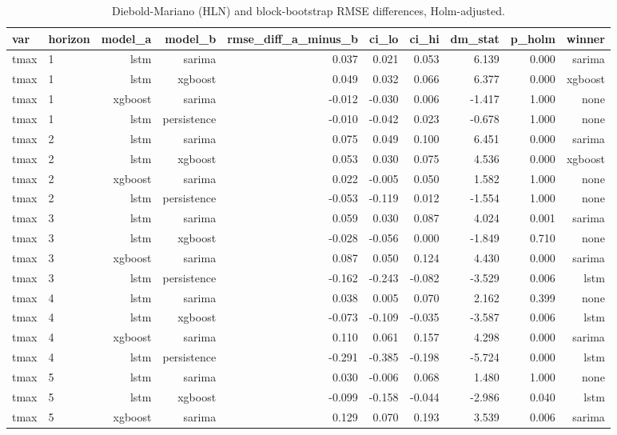 \begin{table}[t]
\centering
\caption{Diebold-Mariano (HLN) and block-bootstrap RMSE differences, Holm-adjusted.}
\label{tab:sig}
\begin{tabular}{llrrrrrrrr}
\toprule
var & horizon & model\_a & model\_b & rmse\_diff\_a\_minus\_b & ci\_lo & ci\_hi & dm\_stat & p\_holm & winner \\
\midrule
tmax & 1 & lstm & sarima & 0.037 & 0.021 & 0.053 & 6.139 & 0.000 & sarima \\
tmax & 1 & lstm & xgboost & 0.049 & 0.032 & 0.066 & 6.377 & 0.000 & xgboost \\
tmax & 1 & xgboost & sarima & -0.012 & -0.030 & 0.006 & -1.417 & 1.000 & none \\
tmax & 1 & lstm & persistence & -0.010 & -0.042 & 0.023 & -0.678 & 1.000 & none \\
tmax & 2 & lstm & sarima & 0.075 & 0.049 & 0.100 & 6.451 & 0.000 & sarima \\
tmax & 2 & lstm & xgboost & 0.053 & 0.030 & 0.075 & 4.536 & 0.000 & xgboost \\
tmax & 2 & xgboost & sarima & 0.022 & -0.005 & 0.050 & 1.582 & 1.000 & none \\
tmax & 2 & lstm & persistence & -0.053 & -0.119 & 0.012 & -1.554 & 1.000 & none \\
tmax & 3 & lstm & sarima & 0.059 & 0.030 & 0.087 & 4.024 & 0.001 & sarima \\
tmax & 3 & lstm & xgboost & -0.028 & -0.056 & 0.000 & -1.849 & 0.710 & none \\
tmax & 3 & xgboost & sarima & 0.087 & 0.050 & 0.124 & 4.430 & 0.000 & sarima \\
tmax & 3 & lstm & persistence & -0.162 & -0.243 & -0.082 & -3.529 & 0.006 & lstm \\
tmax & 4 & lstm & sarima & 0.038 & 0.005 & 0.070 & 2.162 & 0.399 & none \\
tmax & 4 & lstm & xgboost & -0.073 & -0.109 & -0.035 & -3.587 & 0.006 & lstm \\
tmax & 4 & xgboost & sarima & 0.110 & 0.061 & 0.157 & 4.298 & 0.000 & sarima \\
tmax & 4 & lstm & persistence & -0.291 & -0.385 & -0.198 & -5.724 & 0.000 & lstm \\
tmax & 5 & lstm & sarima & 0.030 & -0.006 & 0.068 & 1.480 & 1.000 & none \\
tmax & 5 & lstm & xgboost & -0.099 & -0.158 & -0.044 & -2.986 & 0.040 & lstm \\
tmax & 5 & xgboost & sarima & 0.129 & 0.070 & 0.193 & 3.539 & 0.006 & sarima \\

\end{tabular}
\end{table}
